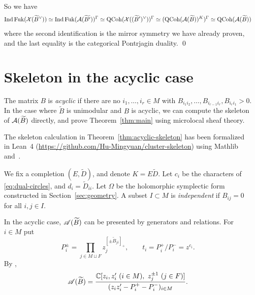\documentclass[12pt, letter]{amsart}
\makeatletter
\newlength{\@tocsectionnumwidth}
\newcommand{\@tocsectionformat}{}
\let\oldappendix\appendix
\renewcommand{\appendix}{%
  \leavevmode\oldappendix%
  \addtocontents{toc}{%
    \protect\settowidth{\protect\@tocsectionnumwidth}{\protect\@tocsectionformat\sectionname\space}%
    \protect\addtolength{\protect\@tocsectionnumwidth}{2em}}%
}
\DeclareMathOperator{\Ind}{Ind}
\DeclareMathOperator{\Fuk}{Fuk}
\theoremstyle{definition}
\makeatother
\begin{document}
So we have
$$\Ind\Fuk(\cX(\widetilde B^\vee)) \simeq \Ind\Fuk(\cA(\widetilde{B'}))^{\Gamma} \simeq \QCoh(\cX((\widetilde B')^\vee))^{\Gamma} \simeq (\QCoh(
\cA(\widetilde{B}))^{K})^{\Gamma} \simeq \QCoh(\cA(\widetilde{B}))$$
where the second identification is the mirror symmetry we have already proven, and the last equality is the categorical Pontrjagin duality.  \qed






\appendix






\section{Skeleton in the acyclic case}
\label{app:acyclic-skeleton}


The  matrix $B$ is \emph{acyclic} if there are no $i_1,\dots,i_r\in M$ with $B_{i_1i_2},\dots,B_{i_{r-1}i_r},B_{i_ri_1}>0$.
In the case where $\widetilde B$ is unimodular and $B$ is acyclic, we can compute the skeleton of \(\mathcal{A}(\widetilde B)\) directly, and prove Theorem~\ref{thm:main} using microlocal sheaf theory.

The skeleton calculation in Theorem~\ref{thm:acyclic-skeleton} has been formalized in Lean~4 (\url{https://github.com/Hu-Mingyuan/cluster-skeleton}) using Mathlib and~\cite{FS-FLTZ-Lean}. 

We fix a completion $(E,\widetilde D)$, and denote $K=E\widetilde D$. Let \(c_i\) be the characters of \eqref{eq:dual-circles},  and $d_i=\widetilde D_{ii}$. Let \(\Omega\) be the holomorphic symplectic form constructed in Section~\ref{sec:geometry}. 
A subset $I\subset M$ is \emph{independent} if $B_{ij}=0$ for all $i,j\in I$. 








In the acyclic case,  $\mathscr{A}(\widetilde B)$ can be presented by generators and relations.
For $i\in M$ put
\[
 P_i^\pm=\prod_{j\in M\sqcup F}z_j^{[\pm\widetilde B_{ji}]_+},\qquad t_i=P_i^+/P_i^-=z^{c_i}.
\]
By \cite[Corollary~1.21]{BFZ-III},
\begin{equation}\label{eq:acyclic-exchange-model}
 \mathscr{A}(\widetilde B)=
 \frac{\mathbb{C}[z_i,z_i'\ (i\in M),\ z_j^{\pm1}\ (j\in F)]}
 {(z_i z_i'-P_i^+-P_i^-)_{i\in M}} .
\end{equation}
\end{document}
